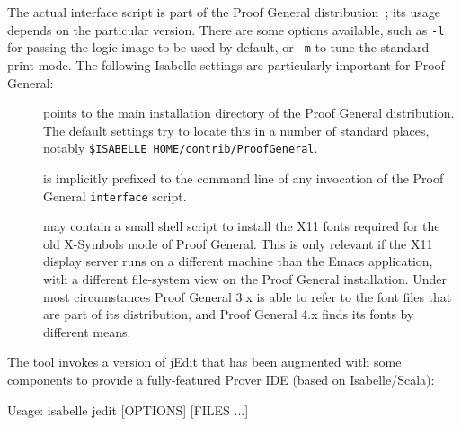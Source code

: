 \begin{isabellebody}
\begin{isamarkuptext}
  The actual interface script is part of the Proof General
  distribution~\cite{proofgeneral}; its usage depends on the
  particular version.  There are some options available, such as
  \verb|-l| for passing the logic image to be used by default,
  or \verb|-m| to tune the standard print mode.  The following
  Isabelle settings are particularly important for Proof General:

  \begin{description}

  \item[\hypertarget{setting.PROOFGENERAL-HOME}{\hyperlink{setting.PROOFGENERAL-HOME}{\mbox{}}}] points to the main
  installation directory of the Proof General distribution.  The
  default settings try to locate this in a number of standard places,
  notably \verb|$ISABELLE_HOME/contrib/ProofGeneral|.

  \item[\hypertarget{setting.PROOFGENERAL-OPTIONS}{\hyperlink{setting.PROOFGENERAL-OPTIONS}{\mbox{}}}] is implicitly prefixed to
  the command line of any invocation of the Proof General \verb|interface| script.

  \item[\hypertarget{setting.XSYMBOL-INSTALLFONTS}{\hyperlink{setting.XSYMBOL-INSTALLFONTS}{\mbox{}}}] may contain a small shell
  script to install the X11 fonts required for the old X-Symbols mode
  of Proof General.  This is only relevant if the X11 display server
  runs on a different machine than the Emacs application, with a
  different file-system view on the Proof General installation.  Under
  most circumstances Proof General 3.x is able to refer to the font
  files that are part of its distribution, and Proof General 4.x finds
  its fonts by different means.

  \end{description}%
\end{isamarkuptext}%
\isamarkuptrue%
%
\isamarkuptrue%
%
\begin{isamarkuptext}%
The \hypertarget{tool.jedit}{\hyperlink{tool.jedit}{\mbox{}}} tool invokes a version of jEdit that has
  been augmented with some components to provide a fully-featured
  Prover IDE (based on Isabelle/Scala):
\begin{ttbox}
Usage: isabelle jedit [OPTIONS] [FILES ...]


\end{ttbox}
\end{isamarkuptext}
\end{isabellebody}
